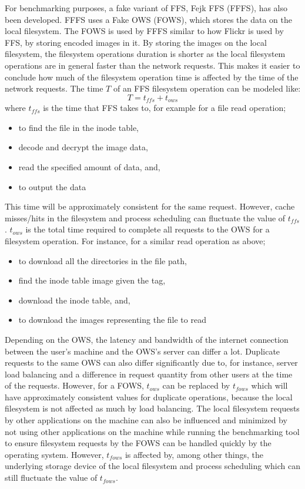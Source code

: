For benchmarking purposes, a fake variant of FFS, Fejk FFS (\gls{FFFS}), has also been developed. FFFS uses a Fake OWS (\gls{FOWS}), which stores the data on the local filesystem. The FOWS is used by FFFS similar to how Flickr is used by FFS, by storing encoded images in it. By storing the images on the local filesystem, the filesystem operations duration is shorter as the local filesystem operations are in general faster than the network requests. This makes it easier to conclude how much of the filesystem operation time is affected by the time of the network requests. The time $T$ of an FFS filesystem operation can be modeled like:
$$
	T = t_{ffs} + t_{ows}
$$
where $t_{ffs}$ is the time that FFS takes to, for example for a file read operation;
\begin{itemize}
	\item to find the file in the inode table,
	\item decode and decrypt the image data,
	\item read the specified amount of data, and,
	\item to output the data
\end{itemize}
This time will be approximately consistent for the same request. However, cache misses/hits in the filesystem and process scheduling can fluctuate the value of $t_{ffs}$. $t_{ows}$ is the total time required to complete all requests to the OWS for a filesystem operation. For instance, for a similar read operation as above;
\begin{itemize}
	\item to download all the directories in the file path,
	\item find the inode table image given the tag,
	\item download the inode table, and,
	\item to download the images representing the file to read
\end{itemize}
Depending on the OWS, the latency and bandwidth of the internet connection between the user's machine and the OWS's server can differ a lot. Duplicate requests to the same OWS can also differ significantly due to, for instance, server load balancing and a difference in request quantity from other users at the time of the requests. However, for a FOWS, $t_{ows}$ can be replaced by $t_{fows}$ which will have approximately consistent values for duplicate operations, because the local filesystem is not affected as much by load balancing. The local filesystem requests by other applications on the machine can also be influenced and minimized by not using other applications on the machine while running the benchmarking tool to ensure filesystem requests by the FOWS can be handled quickly by the operating system. However, $t_{fows}$ is affected by, among other things, the underlying storage device of the local filesystem and process scheduling which can still fluctuate the value of $t_{fows}$.

